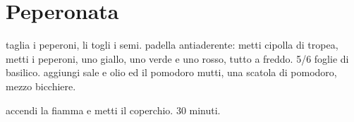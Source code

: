 \section{Peperonata}

\generalRecipeInfos{}

taglia i peperoni, li togli i semi.
padella antiaderente: metti cipolla di tropea, metti i peperoni, uno giallo, uno verde e uno rosso, tutto a freddo. 5/6 foglie di basilico.
aggiungi sale e olio ed il pomodoro mutti, una scatola di pomodoro, mezzo bicchiere.

accendi la fiamma e metti il coperchio. 30 minuti.